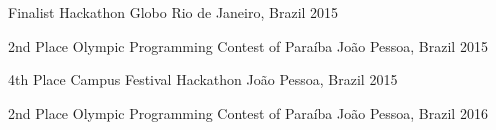 



\begin{cvhonors}

  \cvhonor
    {Finalist} %
    {Hackathon Globo} %
    {Rio de Janeiro, Brazil} %
    {2015} %

  \cvhonor
    {2nd Place} %
    {Olympic Programming Contest of Paraíba} %
    {João Pessoa, Brazil} %
    {2015} %
    
  \cvhonor
    {4th Place} %
    {Campus Festival Hackathon} %
    {João Pessoa, Brazil} %
    {2015} %
    
  \cvhonor
    {2nd Place} %
    {Olympic Programming Contest of Paraíba} %
    {João Pessoa, Brazil} %
    {2016} %

\end{cvhonors}







